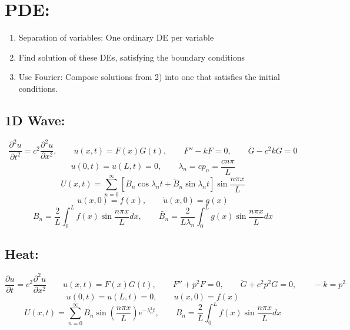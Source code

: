 \documentclass[a4paper,norsk, 10pt]{article}
\begin{document}
\section{PDE:}
\begin{enumerate}
\item Separation of variables: One ordinary DE per variable
\item Find solution of these DEs, satisfying the boundary conditions
\item Use Fourier: Compose solutions from 2) into one that satisfies the initial conditions.
\end{enumerate}
\subsection{1D Wave:}
\begin{equation}
\frac{\partial^2u}{\partial t^2} = c^2 \frac{\partial^2u}{\partial x^2}, \qquad u(x,t) = F(x)G(t), \qquad F'' - kF = 0,\qquad \ddot{G} -c^2kG = 0
\end{equation}
\begin{equation}
u(0,t) = u(L,t) = 0, \qquad \lambda_n = cp_n = \frac{cn\pi}{L}
\end{equation}
\begin{equation}
U(x,t) = \sum_{n=0}^{\infty}\left[B_n\cos\lambda_n t + \tilde{B}_n\sin\lambda_n t\right]\sin\frac{n\pi x}{L}
\end{equation}
\begin{equation}
u(x,0) = f(x), \qquad \dot{u}(x,0) = g(x)
\end{equation}
\begin{equation}
B_n = \frac{2}{L}\int_0^L f(x)\sin\frac{n\pi x}{L} dx, \qquad \tilde{B_n} = \frac{2}{L\lambda_n}\int_0^L g(x)\sin\frac{n\pi x}{L} dx
\end{equation}
\subsection{Heat:}
\begin{equation}
\frac{\partial u}{\partial t} = c^2 \frac{\partial^2u}{\partial x^2} \qquad u(x,t) = F(x)G(t), \qquad F'' + p^2F = 0,\qquad \ddot{G} + c^2p^2G = 0,\qquad -k = p^2
\end{equation}
\begin{equation}
u(0,t) = u(L,t) = 0, \qquad u(x,0) = f(x)
\end{equation}
\begin{equation}
U(x,t) = \sum_{n=0}^{\infty} B_n\sin\left(\frac{n\pi x}{L}\right)e^{-\lambda_n^2 t},\qquad B_n = \frac{2}{L}\int_0^L f(x)\sin\frac{n\pi x}{L} dx
\end{equation}
\end{document}
